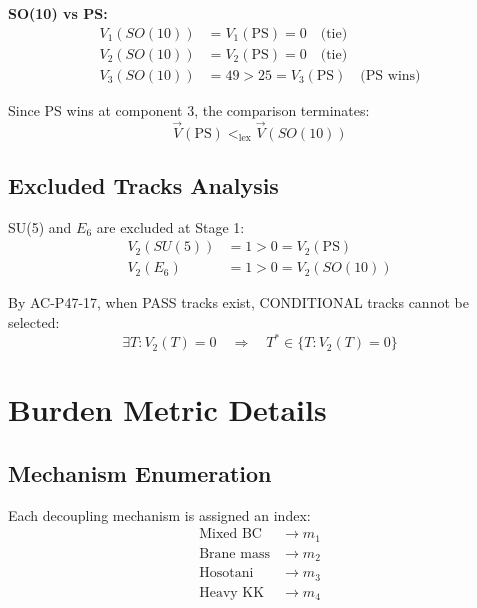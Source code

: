 \documentclass[11pt,a4paper]{article}
\begin{document}
\textbf{SO(10) vs PS:}
\begin{align}
\label{eq:compare-so10-ps-1}
V_1(SO(10)) &= V_1(\text{PS}) = 0 \quad \text{(tie)} \\
\label{eq:compare-so10-ps-2}
V_2(SO(10)) &= V_2(\text{PS}) = 0 \quad \text{(tie)} \\
\label{eq:compare-so10-ps-3}
V_3(SO(10)) &= 49 > 25 = V_3(\text{PS}) \quad \text{(PS wins)}
\end{align}

Since PS wins at component 3, the comparison terminates:
\begin{equation}
\label{eq:ps-beats-so10}
\vec{V}(\text{PS}) <_{\text{lex}} \vec{V}(SO(10))
\end{equation}

\subsection{Excluded Tracks Analysis}
\label{app:excluded}

SU(5) and $E_6$ are excluded at Stage 1:
\begin{align}
\label{eq:su5-excluded}
V_2(SU(5)) &= 1 > 0 = V_2(\text{PS}) \\
\label{eq:e6-excluded}
V_2(E_6) &= 1 > 0 = V_2(SO(10))
\end{align}

By AC-P47-17, when PASS tracks exist, CONDITIONAL tracks cannot be selected:
\begin{equation}
\label{eq:conditional-exclusion}
\exists T : V_2(T) = 0 \quad \Rightarrow \quad T^* \in \{T : V_2(T) = 0\}
\end{equation}

\section{Burden Metric Details}
\label{app:burden-details}

\subsection{Mechanism Enumeration}
\label{app:mech-enum}

Each decoupling mechanism is assigned an index:
\begin{align}
\label{eq:mech-idx-1}
\text{Mixed BC} &\to m_1 \\
\label{eq:mech-idx-2}
\text{Brane mass} &\to m_2 \\
\label{eq:mech-idx-3}
\text{Hosotani} &\to m_3 \\
\label{eq:mech-idx-4}
\text{Heavy KK} &\to m_4
\end{align}
\end{document}
